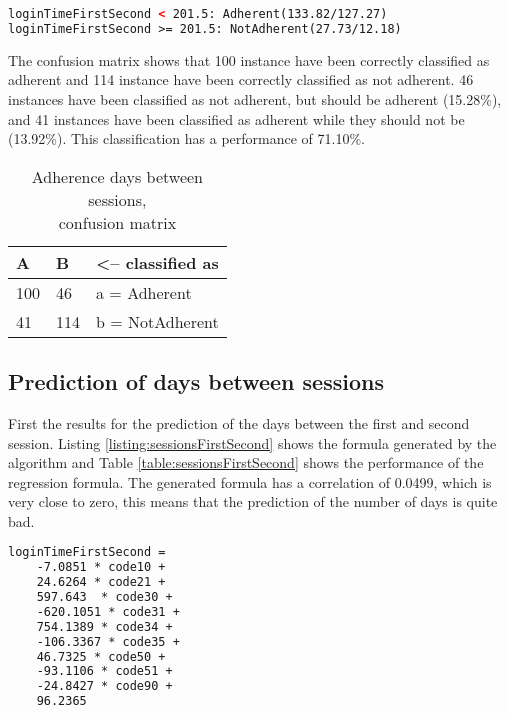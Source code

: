 \begin{lstlisting}[caption={Adherence days between sessions, BFTree decision tree}, label=listing:adherenceSessions, float=htpb, language=xml]
loginTimeFirstSecond < 201.5: Adherent(133.82/127.27)
loginTimeFirstSecond >= 201.5: NotAdherent(27.73/12.18)
\end{lstlisting}

The confusion matrix shows that 100 instance have been correctly classified as adherent and 114 instance have been correctly classified as not adherent. 46 instances have been classified as not adherent, but should be adherent (15.28\%), and 41 instances have been classified as adherent while they should not be (13.92\%). This classification has a performance of 71.10\%.

\begin{table}[]
	\centering
	\caption{Adherence days between sessions, \\confusion matrix}
	\label{table:adherenceSessionsMatrix}
	\begin{tabular}{@{}ll|l@{}}
		\toprule
		\textbf{A} & \textbf{B} & \textless-- classified as \\ \midrule
		100        & 46         & a = Adherent              \\
		41         & 114        & b = NotAdherent           \\ \bottomrule
	\end{tabular}
\end{table}


\subsection{Prediction of days between sessions}
First the results for the prediction of the days between the first and second session. Listing \ref{listing:sessionsFirstSecond} shows the formula generated by the  algorithm and Table \ref{table:sessionsFirstSecond} shows the performance of the regression formula. The generated formula has a correlation of 0.0499, which is very close to zero, this means that the prediction of the number of days is quite bad.

\begin{lstlisting}[caption={Formula prediction of days between session one and two}, label=listing:sessionsFirstSecond, float=htpb, language=xml]
loginTimeFirstSecond =
	-7.0851 * code10 +
	24.6264 * code21 +
	597.643  * code30 +
	-620.1051 * code31 +
	754.1389 * code34 +
	-106.3367 * code35 +
	46.7325 * code50 +
	-93.1106 * code51 +
	-24.8427 * code90 +
	96.2365
\end{lstlisting}

